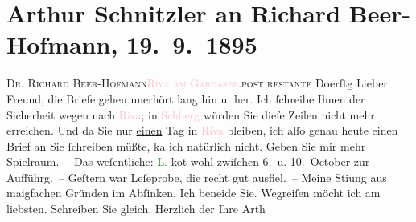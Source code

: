 

               \section[Arthur Schnitzler an Richard Beer-Hofmann, 19. 9. 1895]{ Arthur Schnitzler an Richard Beer-Hofmann,
               19. 9. 1895}\nopagebreak{}\rehead{ }\normalsize\beginnumbering{} \toendnotes[C]{\smallbreak\pagebreak[2]} 
\pstart{}{\pb}\textsc{Dr. Richard Beer-Hofmann}\pend{}\pstart{}\textsc{\textcolor{pink}{Riva am Gardasee}{}\ledrightnote{\textcolor{pink}{Riva del Garda}}.}\pend{}\pstart{}\textsc{post restante}\pend{}{\bigskip}\pstart
           \raggedleft{}{\pb}Do{\geminationn}erſtg\pend
           \pstart
           Lieber Freund, die Briefe gehen unerhört lang hin u. her. Ich
               ſchreibe Ihnen der Sicherheit wegen nach \textcolor{pink}{Riva}{}\ledrightnote{\textcolor{pink}{Riva del Garda}}; in
                  \textcolor{pink}{Schberg}{}\ledrightnote{\textcolor{pink}{Schönberg im Stubaital}} würden Sie dieſe Zeilen nicht mehr
               erreichen. Und da Sie nur \uline{einen} Tag in \textcolor{pink}{Riva}{}\ledrightnote{\textcolor{pink}{Riva del Garda}} bleiben, ich alſo genau heute einen Brief an Sie ſchreiben
               müßte, ka{\geminationn} ich natürlich nicht. Geben Sie mir mehr
               Spielraum. – Das weſentliche: \textcolor{green}{L.}{}\ledrightnote{\textcolor{green}{Liebelei. Schauspiel in drei Akten}} ko{\geminationm}t wohl zwiſchen 6. u.
                  10. October zur Aufführg. – Geſtern war Leſeprobe, die recht
               gut ausfiel. – Meine Sti{\geminationm}ung aus ma{\geminationn}igfachen Gründen im Abſinken. Ich beneide Sie.
               Wegreiſen möcht ich am liebsten. Schreiben Sie gleich. Herzlich der Ihre
                  \spacefill\mbox{Arth}\pend
           \endnumbering{}  
      